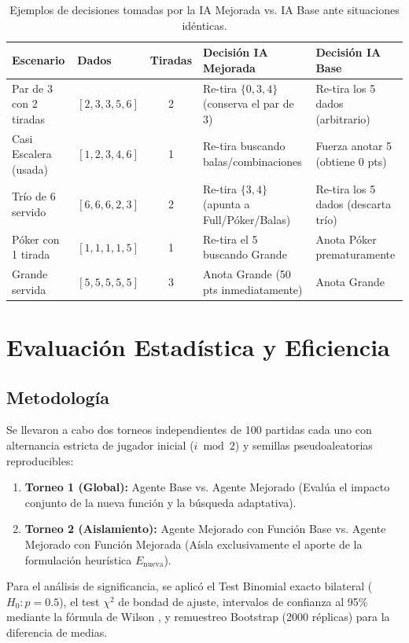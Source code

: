 \documentclass[10pt, a4paper]{article}
\begin{document}
\begin{table}[htbp]
\centering
\small
\caption{Ejemplos de decisiones tomadas por la IA Mejorada vs. IA Base ante situaciones idénticas.}
\label{tab:decisiones_ejemplos}
\begin{tabular}{p{3.2cm}p{1.8cm}cp{3.8cm}p{3.2cm}}
\toprule
\textbf{Escenario} & \textbf{Dados} & \textbf{Tiradas} & \textbf{Decisión IA Mejorada} & \textbf{Decisión IA Base} \\
\midrule
Par de 3 con 2 tiradas & $[2, 3, 3, 5, 6]$ & 2 & Re-tira $\{0, 3, 4\}$ (conserva el par de 3) & Re-tira los 5 dados (arbitrario) \\
Casi Escalera (usada) & $[1, 2, 3, 4, 6]$ & 1 & Re-tira buscando balas/combinaciones & Fuerza anotar 5 (obtiene 0 pts) \\
Trío de 6 servido & $[6, 6, 6, 2, 3]$ & 2 & Re-tira $\{3, 4\}$ (apunta a Full/Póker/Balas) & Re-tira los 5 dados (descarta trío) \\
Póker con 1 tirada & $[1, 1, 1, 1, 5]$ & 1 & Re-tira el 5 buscando Grande & Anota Póker prematuramente \\
Grande servida & $[5, 5, 5, 5, 5]$ & 3 & Anota Grande (50 pts inmediatamente) & Anota Grande \\
\bottomrule
\end{tabular}
\end{table}

\section{Evaluación Estadística y Eficiencia}

\subsection{Metodología}
Se llevaron a cabo dos torneos independientes de 100 partidas cada uno con alternancia estricta de jugador inicial ($i \bmod 2$) y semillas pseudoaleatorias reproducibles:
\begin{enumerate}
    \item \textbf{Torneo 1 (Global):} Agente Base vs. Agente Mejorado (Evalúa el impacto conjunto de la nueva función y la búsqueda adaptativa).
    \item \textbf{Torneo 2 (Aislamiento):} Agente Mejorado con Función Base vs. Agente Mejorado con Función Mejorada (Aísla exclusivamente el aporte de la formulación heurística $E_{\text{nueva}}$).
\end{enumerate}
Para el análisis de significancia, se aplicó el Test Binomial exacto bilateral ($H_0: p = 0.5$), el test $\chi^2$ de bondad de ajuste, intervalos de confianza al 95\% mediante la fórmula de Wilson \cite{wilson1927interval}, y remuestreo Bootstrap (2000 réplicas) para la diferencia de medias.
\end{document}
